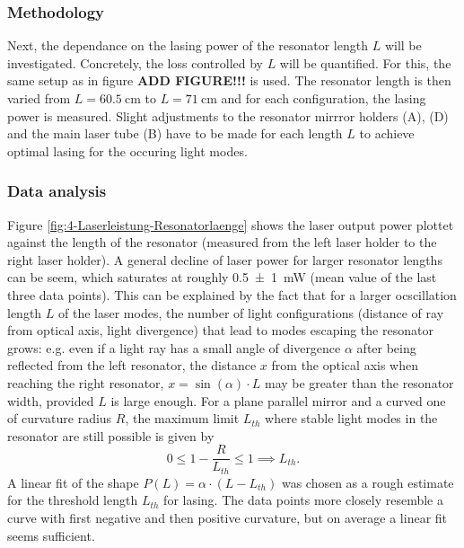 \documentclass[../main.tex]{subfiles}
\begin{document}
    
\subsubsection*{Methodology}
    Next, the dependance on the lasing power of the resonator length $L$ will be investigated. Concretely, the loss controlled by $L$ will be quantified. For this, the same setup as in figure \textbf{ADD FIGURE!!!} is used. The resonator length is then varied from $L = \SI{60.5}{\cm}$ to $L = \SI{71}{\cm}$ and for each configuration, the lasing power is measured. Slight adjustments to the resonator mirrror holders (A), (D) and the main laser tube (B) have to be made for each length $L$ to achieve optimal lasing for the occuring light modes.

\subsubsection*{Data analysis}
    Figure \ref{fig:4-Laserleistung-Resonatorlaenge} shows the laser output power plottet against the length of the resonator (measured from the left laser holder to the right laser holder). A general decline of laser power for larger resonator lengths can be seem, which saturates at roughly \SI{0.5(10)}{\mW} (mean value of the last three data points). This can be explained by the fact that for a larger ocscillation length $L$ of the laser modes, the number of light configurations (distance of ray from optical axis, light divergence) that lead to modes escaping the resonator grows: e.g. even if a light ray has a small angle of divergence $\alpha$ after being reflected from the left resonator, the distance $x$ from the optical axis when reaching the right resonator, $x = \sin(\alpha)\cdot L$ may be greater than the resonator width, provided $L$ is large enough. For a plane parallel mirror and a curved one of curvature radius $R$, the maximum limit $L_{th}$ where stable light modes in the resonator are still possible is given by 
    \[
        0 \le 1 - \frac{R}{L_{th}} \le 1 \implies L_{th}.    
    \]
    A linear fit of the shape $P(L) = \alpha\cdot (L - L_{th})$ was chosen as a rough estimate for the threshold length $L_{th}$ for lasing. The data points more closely resemble a curve with first negative and then positive curvature, but on average a linear fit seems sufficient.
\end{document}
